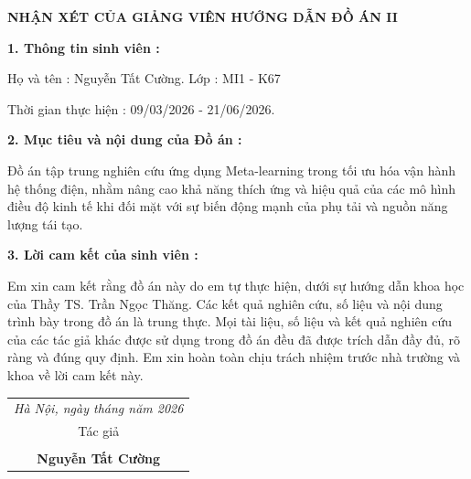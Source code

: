 \newpage

\thispagestyle{empty}


\begin{center}
    \vspace*{0.5cm} %
    \textbf{\fontsize{14pt}{1.3}\selectfont NHẬN XÉT CỦA GIẢNG VIÊN HƯỚNG DẪN ĐỒ ÁN II}
\end{center}

\vspace{0.5cm}

\noindent \textbf{1. Thông tin sinh viên :}

\noindent \hspace*{1cm}Họ và tên : Nguyễn Tất Cường. \quad Lớp : MI1 - K67

\noindent \hspace*{1cm}Thời gian thực hiện : 09/03/2026 - 21/06/2026.

\vspace{0.5cm}

\noindent \textbf{2. Mục tiêu và nội dung của Đồ án :}

\noindent \hspace*{1cm}Đồ án tập trung nghiên cứu ứng dụng Meta-learning trong tối ưu hóa vận hành hệ thống điện, nhằm nâng cao khả năng thích ứng và hiệu quả của các mô hình điều độ kinh tế khi đối mặt với sự biến động mạnh của phụ tải và nguồn năng lượng tái tạo.

\vspace{0.5cm}

\noindent \textbf{3. Lời cam kết của sinh viên :}

\noindent \hspace*{1cm}Em xin cam kết rằng đồ án này do em tự thực hiện, dưới sự hướng dẫn khoa học của Thầy TS. Trần Ngọc Thăng. Các kết quả nghiên cứu, số liệu và nội dung trình bày trong đồ án là trung thực. Mọi tài liệu, số liệu và kết quả nghiên cứu của các tác giả khác được sử dụng trong đồ án đều đã được trích dẫn đầy đủ, rõ ràng và đúng quy định. Em xin hoàn toàn chịu trách nhiệm trước nhà trường và khoa về lời cam kết này.

\vspace{0.2cm}
\begin{flushright}
    \begin{tabular}{c}
        \textit{Hà Nội, ngày \quad tháng \quad năm 2026} \\
        Tác giả \\
        \vspace{1.5cm} \\
        \textbf{Nguyễn Tất Cường}
    \end{tabular} \hspace{1cm}
\end{flushright}

